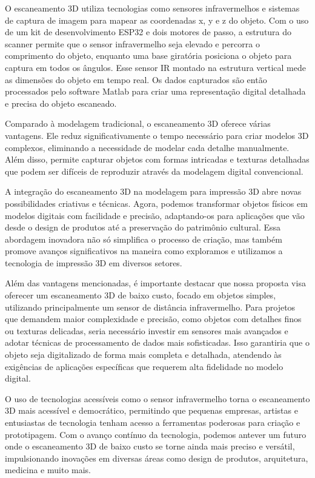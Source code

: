 O escaneamento 3D utiliza tecnologias como sensores infravermelhos e sistemas de captura de imagem para mapear as coordenadas x, y e z do objeto. Com o uso de um kit de desenvolvimento ESP32 e dois motores de passo, a estrutura do scanner permite que o sensor infravermelho seja elevado e percorra o comprimento do objeto, enquanto uma base giratória posiciona o objeto para captura em todos os ângulos. Esse sensor IR montado na estrutura vertical mede as dimensões do objeto em tempo real. Os dados capturados são então processados pelo software Matlab para criar uma representação digital detalhada e precisa do objeto escaneado.

Comparado à modelagem tradicional, o escaneamento 3D oferece várias vantagens. Ele reduz significativamente o tempo necessário para criar modelos 3D complexos, eliminando a necessidade de modelar cada detalhe manualmente. Além disso, permite capturar objetos com formas intricadas e texturas detalhadas que podem ser difíceis de reproduzir através da modelagem digital convencional.

A integração do escaneamento 3D na modelagem para impressão 3D abre novas possibilidades criativas e técnicas. Agora, podemos transformar objetos físicos em modelos digitais com facilidade e precisão, adaptando-os para aplicações que vão desde o design de produtos até a preservação do patrimônio cultural. Essa abordagem inovadora não só simplifica o processo de criação, mas também promove avanços significativos na maneira como exploramos e utilizamos a tecnologia de impressão 3D em diversos setores.

Além das vantagens mencionadas, é importante destacar que nossa proposta visa oferecer um escaneamento 3D de baixo custo, focado em objetos simples, utilizando principalmente um sensor de distância infravermelho. Para projetos que demandem maior complexidade e precisão, como objetos com detalhes finos ou texturas delicadas, seria necessário investir em sensores mais avançados e adotar técnicas de processamento de dados mais sofisticadas. Isso garantiria que o objeto seja digitalizado de forma mais completa e detalhada, atendendo às exigências de aplicações específicas que requerem alta fidelidade no modelo digital.

O uso de tecnologias acessíveis como o sensor infravermelho torna o escaneamento 3D mais acessível e democrático, permitindo que pequenas empresas, artistas e entusiastas de tecnologia tenham acesso a ferramentas poderosas para criação e prototipagem. Com o avanço contínuo da tecnologia, podemos antever um futuro onde o escaneamento 3D de baixo custo se torne ainda mais preciso e versátil, impulsionando inovações em diversas áreas como design de produtos, arquitetura, medicina e muito mais.